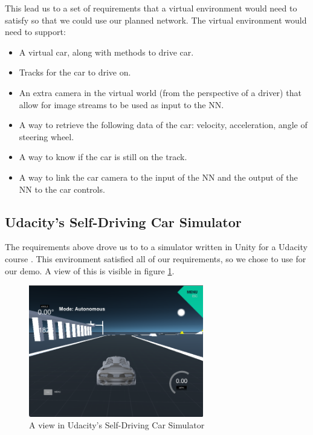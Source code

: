 \documentclass[12pt, conference, compsoc]{IEEEtran}
\begin{document}
This lead us to a set of requirements that a virtual environment would need to satisfy so that we could use our planned network. The virtual environment would need to support:
\begin{itemize}
    \item A virtual car, along with methods to drive car.
    \item Tracks for the car to drive on.
    \item An extra camera in the virtual world (from the perspective of a driver) that allow for image streams to be used as input to the NN.
    \item A way to retrieve the following data of the car: velocity, acceleration, angle of steering wheel.
    \item A way to know if the car is still on the track.
    \item A way to link the car camera to the input of the NN and the output of the NN to the car controls.
\end{itemize}

\subsection{Udacity's Self-Driving Car Simulator}
The requirements above drove us to%
to a simulator written in Unity for a Udacity course \cite{Udacity-course}. This environment satisfied all of our requirements, so we chose to use for our demo. A view of this is visible in figure \ref{fig:udacity}.

\begin{figure}[!t]
\centering
\includegraphics[width=3in]{Udacity-Simulator}
\caption{A view in Udacity's Self-Driving Car Simulator}
\label{fig:udacity}
\end{figure}
\end{document}
